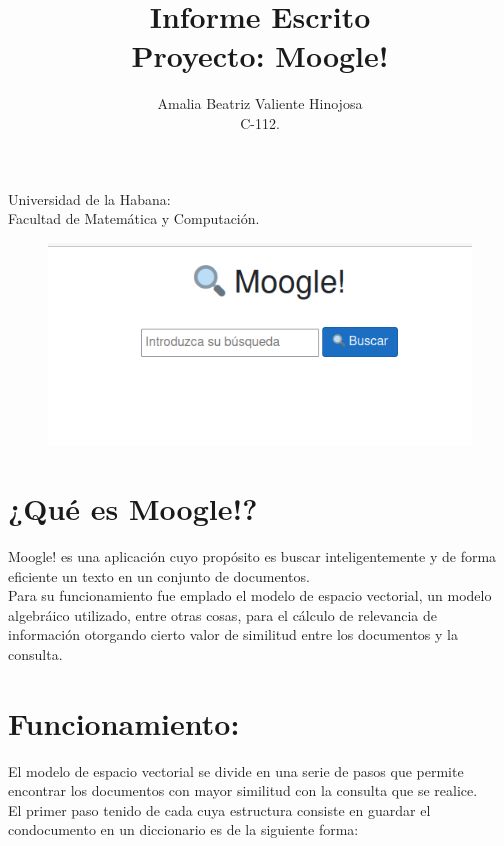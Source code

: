 \documentclass[12 pt]{article}
\begin{document}
\title{Informe Escrito\\Proyecto: Moogle! }
\author{Amalia Beatriz Valiente Hinojosa\\ C-112.} 
\date{} 
\maketitle

\begin{center}
     Universidad de la Habana: \\ 
     Facultad de Matemática y
Computación.\\ 
\end{center}

\begin{figure}[h] 
    \begin{center} 
        \includegraphics[width = 1 \linewidth]{foto.png} 
    \end{center}
\end{figure}


\newpage

\section{¿Qué es Moogle!?} 
Moogle! es una aplicación cuyo propósito es buscar
inteligentemente y de forma eficiente un texto en un conjunto de documentos.
\\Para su funcionamiento fue emplado el modelo de espacio vectorial, un modelo
algebráico utilizado, entre otras cosas, para el cálculo de relevancia de
información otorgando cierto valor de similitud entre los documentos y la
consulta.

\newpage
\section{Funcionamiento:} 
El modelo de espacio vectorial se divide en una serie
de pasos que permite encontrar los documentos con mayor similitud con la
consulta que se realice.\\El primer paso tenido de cada cuya estructura consiste
en guardar el condocumento en un diccionario es de la siguiente forma:\\
\end{document}
